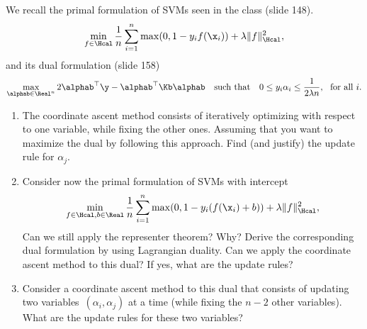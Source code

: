\documentclass[12pt]{article}
\newcounter{exo}
\newenvironment{exo}[1]{\refstepcounter{exo}\vspace{0.5cm}{\bfseries Exercice \theexo. #1\\ }}{\par\vspace{0.5cm}}
\begin{document}
\begin{exo}{Dual coordinate ascent algorithms for SVMs}
We recall the primal formulation of SVMs seen in the class (slide 148).
   $$
   \min_{f \in \Hcal} \frac{1}{n} \sum_{i=1}^n \max(0,1-y_i f(\x_i)) + \lambda \|f\|_{\Hcal}^2,
   $$
   and its dual formulation (slide 158)
   $$
   \max_{\alphab \in \Real^n} 2 \alphab^\top \y - \alphab^\top \Kb\alphab ~~~\text{such that}~~~ 0 \leq y_i \alpha_i \leq \frac{1}{2\lambda n},~~\text{for all}~i.
   $$
\begin{enumerate}
\item    The coordinate ascent method consists of iteratively optimizing with respect to one variable, while fixing the other ones.
   Assuming that you want to maximize the dual by following this approach. Find (and justify) the update rule for $\alpha_j$.
\item   Consider now the primal formulation of SVMs with intercept
   $$
   \min_{f \in \Hcal, b \in \Real} \frac{1}{n} \sum_{i=1}^n \max(0,1-y_i (f(\x_i)+b)) + \lambda \|f\|_{\Hcal}^2,
   $$
   Can we still apply the representer theorem? Why?  Derive the corresponding
   dual formulation by using Lagrangian duality.  Can we apply the coordinate
   ascent method to this dual? If yes, what are the update rules?
\item
   Consider a coordinate ascent method to this dual that consists of updating
   two variables~$(\alpha_i,\alpha_j)$ at a time (while fixing the $n-2$ other
   variables). What are the update rules for these two variables?
   \end{enumerate}
\end{exo}
\end{document}
